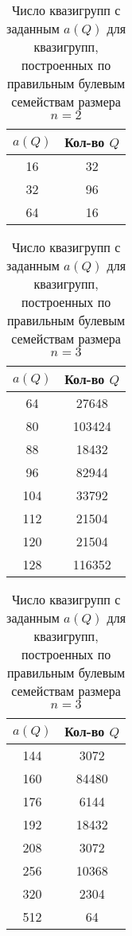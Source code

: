     \begin{table}[h]
        \centering
        \captionsetup{justification=centering} %
        \caption{\label{tab:associdx2} Число квазигрупп с заданным $a(Q)$ для квазигрупп, построенных по правильным булевым семействам размера $n=2$}
        \begin{tabular}{|c|c|}
            \toprule
            $a(Q)$ & Кол-во $Q$ \\
            \midrule
            16 & 32 \\
            \midrule
            32 & 96 \\
            \midrule
            64 & 16 \\
            \bottomrule
        \end{tabular}
    \end{table}

    \begin{table}[h]
        \centering
        \captionsetup{justification=centering} %
        \caption{\label{tab:associdx3} Число квазигрупп с заданным  $a(Q)$ для квазигрупп, построенных по правильным булевым семействам размера $n=3$}
        \begin{minipage}[h]{0.49\linewidth}
            \begin{tabular}{|c|c|}
                \toprule
                $a(Q)$ & Кол-во $Q$ \\
                \midrule
                64 & 27648 \\
                80 & 103424 \\
                88 & 18432 \\
                96 & 82944 \\
                104 & 33792 \\
                112 & 21504 \\
                120 & 21504 \\
                128 & 116352 \\
                \bottomrule
            \end{tabular}
        \end{minipage}
        \hfill
        \begin{minipage}[h]{0.49\linewidth}
            \begin{tabular}{|c|c|}
                \toprule
                $a(Q)$ & Кол-во $Q$ \\
                \midrule
                144 & 3072 \\
                160 & 84480 \\
                176 & 6144 \\
                192 & 18432 \\
                208 & 3072 \\
                256 & 10368 \\
                320 & 2304 \\
                512 & 64 \\
                \bottomrule
            \end{tabular}
        \end{minipage}
    \end{table}

